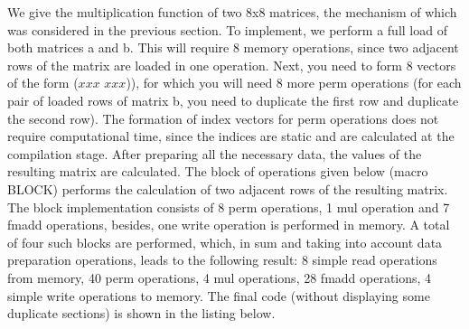 \documentclass[
11pt,%
tightenlines,%
twoside,%
onecolumn,%
nofloats,%
nobibnotes,%
nofootinbib,%
superscriptaddress,%
noshowpacs,%
centertags]%
{revtex4}
\begin{document}
We give the multiplication function of two 8x8 matrices, the mechanism of which was considered in the previous section. To implement, we perform a full load of both matrices a and b. This will require 8 memory operations, since two adjacent rows of the matrix are loaded in one operation. Next, you need to form 8 vectors of the form ($xxx$ $xxx$)), for which you will need 8 more perm operations (for each pair of loaded rows of matrix b, you need to duplicate the first row and duplicate the second row). The formation of index vectors for perm operations does not require computational time, since the indices are static and are calculated at the compilation stage.
After preparing all the necessary data, the values ​​of the resulting matrix are calculated. The block of operations given below (macro BLOCK) performs the calculation of two adjacent rows of the resulting matrix. The block implementation consists of 8 perm operations, 1 mul operation and 7 fmadd operations, besides, one write operation is performed in memory. A total of four such blocks are performed, which, in sum and taking into account data preparation operations, leads to the following result: 8 simple read operations from memory, 40 perm operations, 4 mul operations, 28 fmadd operations, 4 simple write operations to memory. The final code (without displaying some duplicate sections) is shown in the listing below.
\end{document}
